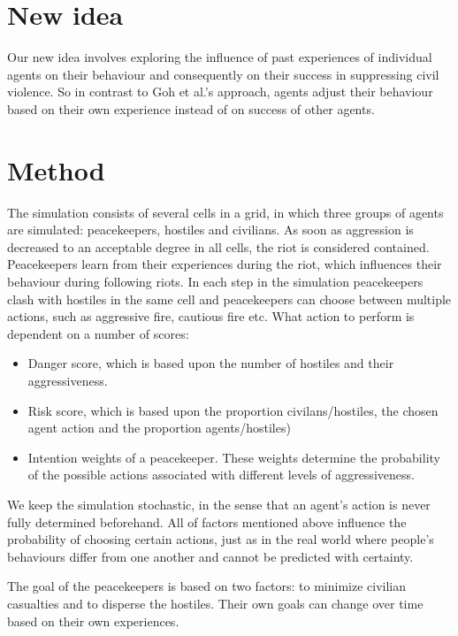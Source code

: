 \documentclass[11pt,a4paper]{article}
\begin{document}
	\section{New idea}
		Our new idea involves exploring the influence of past experiences of individual agents on their behaviour and consequently on their success in suppressing civil violence. So in contrast to Goh et al.'s approach, agents adjust their behaviour based on their own experience instead of on success of other agents. 
		
	\section{Method}
		The simulation consists of several cells in a grid, in which three groups of agents are simulated: peacekeepers, hostiles and civilians. As soon as aggression is decreased to an acceptable degree in all cells, the riot is considered contained. Peacekeepers learn from their experiences during the riot, which influences their behaviour during following riots. In each step in the simulation peacekeepers clash with hostiles in the same cell and peacekeepers can choose between multiple actions, such as aggressive fire, cautious fire etc. What action to perform is dependent on a number of scores:
		
		\begin{itemize}
			\item Danger score, which is based upon the number of hostiles and their aggressiveness.
			\item Risk score, which is based upon the proportion civilans/hostiles, the chosen agent action and the proportion agents/hostiles)
			\item Intention weights of a peacekeeper. These weights determine the probability of the possible actions associated with different levels of aggressiveness.
		\end{itemize}
		
		We keep the simulation stochastic, in the sense that an agent's action is never fully determined beforehand. All of factors mentioned above influence the probability of choosing certain actions, just as in the real world where people's behaviours differ from one another and cannot be predicted with certainty.
	
		The goal of the peacekeepers is based on two factors: to minimize civilian casualties and to disperse the hostiles. Their own goals can change over time based on their own experiences. 
		
\end{document}
